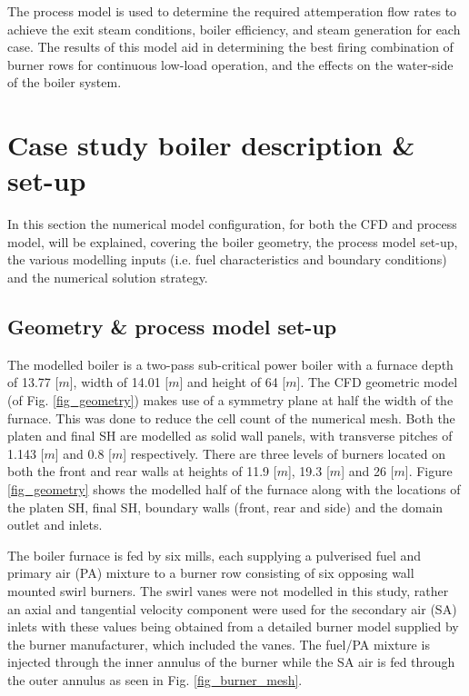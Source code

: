 \documentclass[twocolumn,10pt]{asme2ej}
\begin{document}
The process model is used to determine the required attemperation flow rates to achieve the exit steam conditions, boiler efficiency, and steam generation for each case. The results of this model aid in determining the best firing combination of burner rows for continuous low-load operation, and the effects on the water-side of the boiler system.

\section{Case study boiler description \& set-up}
In this section the numerical model configuration, for both the CFD and process model, will be explained, covering the boiler geometry, the process model set-up, the various  modelling inputs (i.e. fuel characteristics and boundary conditions) and the numerical solution strategy.

\subsection{Geometry \& process model set-up} \label{sec_set_up}
The modelled  boiler is a two-pass sub-critical power boiler with a furnace depth of 13.77 [$m$], width of 14.01 [$m$] and height of 64 [$m$]. The CFD geometric model (of Fig. \ref{fig_geometry}) makes use of a symmetry plane at half the width of the furnace. This was done to reduce the cell count of the numerical mesh. Both the platen and final SH are modelled as solid wall panels, with transverse pitches of 1.143 [$m$] and 0.8 [$m$] respectively. There are three levels of burners located on both the front and rear walls at heights of 11.9 [$m$], 19.3 [$m$] and 26 [$m$]. Figure \ref{fig_geometry} shows the modelled half of the furnace along with the locations of the platen SH, final SH, boundary walls (front, rear and side) and the domain outlet and inlets.

The boiler furnace is fed by six mills, each supplying a pulverised fuel and primary air (PA) mixture to a burner row consisting of six opposing wall mounted swirl burners. The swirl vanes were not modelled in this study, rather an axial and tangential velocity component were used for the secondary air (SA) inlets with these values being obtained from a detailed burner model supplied by the burner manufacturer, which included the vanes. The fuel/PA mixture is injected through the inner annulus of the burner while the SA air is fed through the outer annulus as seen in Fig. \ref{fig_burner_mesh}.
\end{document}
